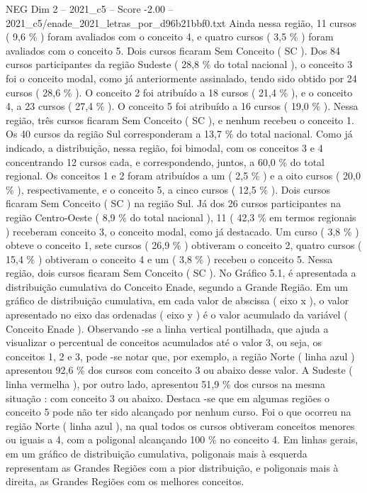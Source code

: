 \begin{textsample}{NEG Dim 2 – 2021\_c5 – Score -2.00 – 2021\_c5/enade\_2021\_letras\_por\_d96b21bbf0.txt}
Ainda nessa região, 11 cursos ( 9,6 \% ) foram avaliados com o conceito 4, e quatro cursos ( 3,5 \% ) foram avaliados com o conceito 5.
Dois cursos ficaram Sem Conceito ( SC ).
Dos 84 cursos participantes da região Sudeste ( 28,8 \% do total nacional ), o conceito 3 foi o conceito modal, como já anteriormente assinalado, tendo sido obtido por 24 cursos ( 28,6 \% ).
O conceito 2 foi atribuído a 18 cursos ( 21,4 \% ), e o conceito 4, a 23 cursos ( 27,4 \% ).
O conceito 5 foi atribuído a 16 cursos ( 19,0 \% ).
Nessa região, três cursos ficaram Sem Conceito ( SC ), e nenhum recebeu o conceito 1.
Os 40 cursos da região Sul corresponderam a 13,7 \% do total nacional.
Como já indicado, a distribuição, nessa região, foi bimodal, com os conceitos 3 e 4 concentrando 12 cursos cada, e correspondendo, juntos, a 60,0 \% do total regional.
Os conceitos 1 e 2 foram atribuídos a um ( 2,5 \% ) e a oito cursos ( 20,0 \% ), respectivamente, e o conceito 5, a cinco cursos ( 12,5 \% ).
Dois cursos ficaram Sem Conceito ( SC ) na região Sul.
Já dos 26 cursos participantes na região Centro-Oeste ( 8,9 \% do total nacional ), 11 ( 42,3 \% em termos regionais ) receberam conceito 3, o conceito modal, como já destacado.
Um curso ( 3,8 \% ) obteve o conceito 1, sete cursos ( 26,9 \% ) obtiveram o conceito 2, quatro cursos ( 15,4 \% ) obtiveram o conceito 4 e um ( 3,8 \% ) recebeu o conceito 5.
Nessa região, dois cursos ficaram Sem Conceito ( SC ).
No Gráfico 5.1, é apresentada a distribuição cumulativa do Conceito Enade, segundo a Grande Região.
Em um gráfico de distribuição cumulativa, em cada valor de abscissa ( eixo x ), o valor apresentado no eixo das ordenadas ( eixo y ) é o valor acumulado da variável ( Conceito Enade ).
Observando -se a linha vertical pontilhada, que ajuda a visualizar o percentual de conceitos acumulados até o valor 3, ou seja, os conceitos 1, 2 e 3, pode -se notar que, por exemplo, a região Norte ( linha azul ) apresentou 92,6 \% dos cursos com conceito 3 ou abaixo desse valor.
A Sudeste ( linha vermelha ), por outro lado, apresentou 51,9 \% dos cursos na mesma situação : com conceito 3 ou abaixo.
Destaca -se que em algumas regiões o conceito 5 pode não ter sido alcançado por nenhum curso.
Foi o que ocorreu na região Norte ( linha azul ), na qual todos os cursos obtiveram conceitos menores ou iguais a 4, com a poligonal alcançando 100 \% no conceito 4.
Em linhas gerais, em um gráfico de distribuição cumulativa, poligonais mais à esquerda representam as Grandes Regiões com a pior distribuição, e poligonais mais à direita, as Grandes Regiões com os melhores conceitos.

\end{textsample}

